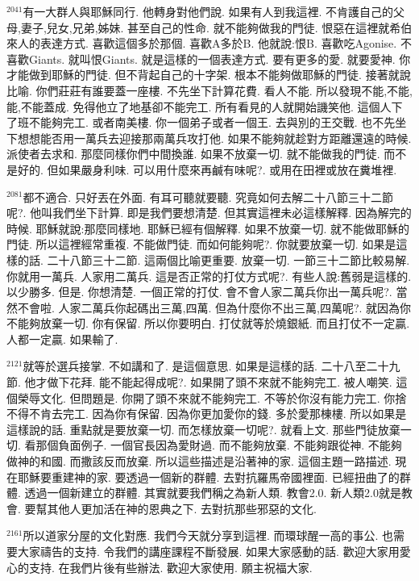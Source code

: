 \documentclass{book}
\begin{document}
$^{2041}$有一大群人與耶穌同行.
他轉身對他們說.
如果有人到我這裡.
不肯護自己的父母,妻子,兒女,兄弟,姊妹.
甚至自己的性命.
就不能夠做我的門徒.
恨惡在這裡就希伯來人的表達方式.
喜歡這個多於那個.
喜歡A多於B.
他就說:恨B.
喜歡吃Agonise.
不喜歡Giants.
就叫恨Giants.
就是這樣的一個表達方式.
要有更多的愛.
就要愛神.
你才能做到耶穌的門徒.
但不背起自己的十字架.
根本不能夠做耶穌的門徒.
接著就說比喻.
你們莊莊有誰要蓋一座樓.
不先坐下計算花費.
看人不能.
所以發現不能,不能,能,不能蓋成.
免得他立了地基卻不能完工.
所有看見的人就開始譏笑他.
這個人下了班不能夠完工.
或者南美樓.
你一個弟子或者一個王.
去與別的王交戰.
也不先坐下想想能否用一萬兵去迎接那兩萬兵攻打他.
如果不能夠就趁對方距離還遠的時候.
派使者去求和.
那麼同樣你們中間換誰.
如果不放棄一切.
就不能做我的門徒.
而不是好的.
但如果嚴身利味.
可以用什麼來再鹹有味呢?.
或用在田裡或放在糞堆裡.

$^{2081}$都不適合.
只好丟在外面.
有耳可聽就要聽.
究竟如何去解二十八節三十二節呢?.
他叫我們坐下計算.
即是我們要想清楚.
但其實這裡未必這樣解釋.
因為解完的時候.
耶穌就說:那麼同樣地.
耶穌已經有個解釋.
如果不放棄一切.
就不能做耶穌的門徒.
所以這裡經常重複.
不能做門徒.
而如何能夠呢?.
你就要放棄一切.
如果是這樣的話.
二十八節三十二節.
這兩個比喻更重要.
放棄一切.
一節三十二節比較易解.
你就用一萬兵.
人家用二萬兵.
這是否正常的打仗方式呢?.
有些人說:舊弱是這樣的.
以少勝多.
但是.
你想清楚.
一個正常的打仗.
會不會人家二萬兵你出一萬兵呢?.
當然不會啦.
人家二萬兵你起碼出三萬,四萬.
但為什麼你不出三萬,四萬呢?.
就因為你不能夠放棄一切.
你有保留.
所以你要明白.
打仗就等於燒銀紙.
而且打仗不一定贏.
人都一定贏.
如果輸了.

$^{2121}$就等於選兵接掌.
不如講和了.
是這個意思.
如果是這樣的話.
二十八至二十九節.
他才做下花拜.
能不能起得成呢?.
如果開了頭不來就不能夠完工.
被人嘲笑.
這個榮辱文化.
但問題是.
你開了頭不來就不能夠完工.
不等於你沒有能力完工.
你捨不得不肯去完工.
因為你有保留.
因為你更加愛你的錢.
多於愛那棟樓.
所以如果是這樣說的話.
重點就是要放棄一切.
而怎樣放棄一切呢?.
就看上文.
那些門徒放棄一切.
看那個負面例子.
一個官長因為愛財過.
而不能夠放棄.
不能夠跟從神.
不能夠做神的和國.
而撒該反而放棄.
所以這些描述是沿著神的家.
這個主題一路描述.
現在耶穌要重建神的家.
要透過一個新的群體.
去對抗羅馬帝國裡面.
已經扭曲了的群體.
透過一個新建立的群體.
其實就要我們稱之為新人類.
教會2.0.
新人類2.0就是教會.
要幫其他人更加活在神的恩典之下.
去對抗那些邪惡的文化.

$^{2161}$所以道家分屋的文化對應.
我們今天就分享到這裡.
而環球醒一高的事公.
也需要大家禱告的支持.
令我們的講座課程不斷發展.
如果大家感動的話.
歡迎大家用愛心的支持.
在我們片後有些辦法.
歡迎大家使用.
願主祝福大家.
\newpage
\end{document}
